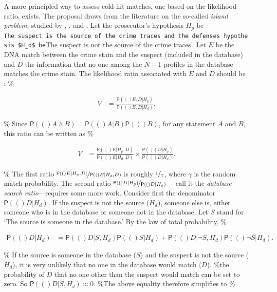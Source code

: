 \documentclass[10pt,dvipsnames,enabledeprecatedfontcommands]{scrartcl}
\newcommand{\pr}[1]{\mathsf{P}(#1)}
\begin{document}
A more principled way to assess cold-hit matches, one based on the
likelihood ratio, exists. The proposal draws from the literature on the
so-called \emph{island problem}, studied by
\citet{eggleston1978evidence}, \citet{dawid1994island}, and
\citet{dawid1996CoherentAnalysisForensic}. Let the prosecutor's
hypothesis \(H_p\) be
\texttt{The\ suspect\ is\ the\ source\ of\ the\ crime\ traces\textquotesingle{}\ and\ the\ defense\textquotesingle{}s\ hypothesis\ \$H\_d\$\ be}The
suspect is not the source of the crime traces'. Let \(E\) be the DNA
match between the crime stain and the suspect (included in the database)
and \(D\) the information that no one among the \(N-1\) profiles in the
database matches the crime stain. The likelihood ratio associated with
\(E\) and \(D\) should be
\citep{balding1996EvaluatingDNAProfilea, taroni2006bayesian}: \%

\begin{align*}
V & = \frac{\pr(E,D\vert H_p)}{\pr(E,D\vert H_d)}.
\end{align*}

\% Since \(\pr(A\wedge B)=\pr(A\vert B)\pr(B)\), for any statement \(A\)
and \(B\), this ratio can be written as \%

\begin{align*}
V & = \frac{\pr(E\vert H_p,D)}{\pr(E\vert H_d,D)} \times \frac{\pr(D\vert H_p)}{\pr(D\vert H_d)}.
\end{align*}

\% The first ratio \(\nicefrac{\pr(E\vert H_p,D)}{\pr(E\vert H_d,D)}\)
is roughly \(\nicefrac{1}{\gamma}\), where \(\gamma\) is the random
match probability. The second ratio
\(\nicefrac{\pr(D\vert H_p)}{\pr(D\vert H_d)}\)--- call it the
\emph{database search ratio}---requires some more work. Consider first
the denominator \(\pr(D \vert H_d)\). If the suspect is not the source
(\(H_d\)), someone else is, either someone who is in the database or
someone not in the database. Let \(S\) stand for `The source is someone
in the database.' By the law of total probability, \%

\begin{align*}
\pr(D\vert H_d) & = \pr(D\vert S, H_d) \pr(S\vert H_d) + \pr(D\vert \neg S, H_d) \pr(\neg S \vert H_d). 
\end{align*}

\% If the source is someone in the database (\(S\)) and the suspect is
not the source (\(H_d\)), it is very unlikely that no one in the
database would match (\(D\)). \%the probability of \(D\) that no one
other than the suspect would match can be set to zero. So
\(\pr(D\vert S, H_d)\approx 0\). \%The above equality therefore
simplifies to \%
\end{document}
